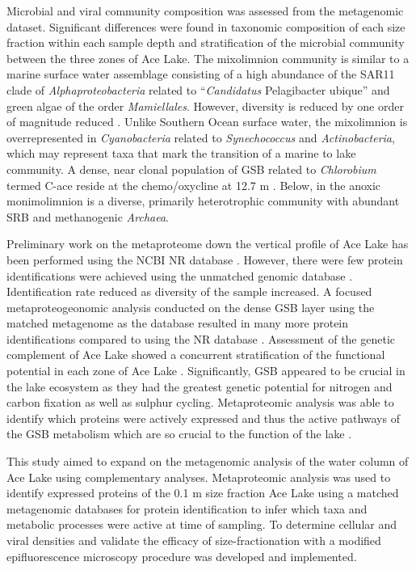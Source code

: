 Microbial and viral community composition was assessed from the metagenomic dataset.
Significant differences were found in taxonomic composition of each size fraction within each sample depth and stratification of the microbial community between the three zones of Ace Lake.
The mixolimnion community is similar to a marine surface water assemblage consisting of a high abundance of the SAR11 clade of \emph{Alphaproteobacteria} related to ``\emph{Candidatus} Pelagibacter ubique'' and green algae of the order \emph{Mamiellales}.
However, diversity is reduced by one order of magnitude reduced \cite{Lauro2011}.
Unlike Southern Ocean surface water, the mixolimnion is overrepresented in \emph{Cyanobacteria} related to \emph{Synechococcus} and \emph{Actinobacteria}, which may represent taxa that mark the transition of a marine to lake community.
A dense, near clonal population of \acl{GSB} related to \emph{Chlorobium} termed C-ace reside at the chemo/oxycline at 12.7 m \cite{Ng2010a, Lauro2011}.
Below, in the anoxic monimolimnion is a diverse, primarily heterotrophic community with abundant \ac{SRB} and methanogenic \emph{Archaea}.

Preliminary work on the metaproteome down the vertical profile of Ace Lake has been performed using the \ac{NCBI} \ac{NR} database \cite{2010b}.
However, there were few protein identifications were achieved using the unmatched genomic database \cite{Ng2010b}.
Identification rate reduced as diversity of the sample increased.
A focused metaproteogeonomic analysis conducted on the dense \ac{GSB} layer using the matched metagenome as the database resulted in many more protein identifications compared to using the \ac{NR} database \cite{Ng2010b}.
Assessment of the genetic complement of Ace Lake showed a concurrent stratification of the functional potential in each zone of Ace Lake \cite{Lauro2011}.
Significantly, \ac{GSB} appeared to be crucial in the lake ecosystem as they had the greatest genetic potential for nitrogen and carbon fixation as well as sulphur cycling\cite{Ng2010b, Lauro2011}.
Metaproteomic analysis was able to identify which proteins were actively expressed and thus the active pathways of the \ac{GSB} metabolism which are so crucial to the function of the lake \cite{Ng2010a}.

This study aimed to expand on the metagenomic analysis of the water column of Ace Lake using complementary analyses.
Metaproteomic analysis was used to identify expressed proteins of the 0.1 \textmu{}m size fraction Ace Lake using a matched metagenomic databases for protein identification to infer which taxa and metabolic processes were active at time of sampling.
To determine cellular and viral densities and validate the efficacy of size-fractionation with a modified epifluorescence microscopy procedure was developed and implemented.

